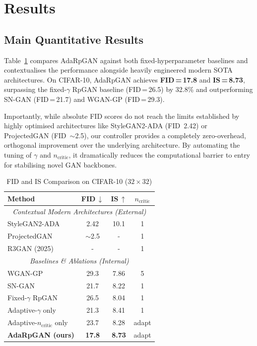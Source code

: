 \documentclass{article}
\newcommand{\ncritic}{n_{\mathrm{critic}}}
\begin{document}
\section{Results}
\label{sec:results}

\subsection{Main Quantitative Results}

Table~\ref{tab:main_results} compares AdaRpGAN against both fixed-hyperparameter baselines and contextualises the performance alongside heavily engineered modern SOTA architectures. 
On CIFAR-10, AdaRpGAN achieves \textbf{FID\,=\,17.8} and \textbf{IS\,=\,8.73}, surpassing the fixed-$\gamma$ RpGAN baseline (FID\,=\,26.5) by 32.8\% and outperforming SN-GAN (FID\,=\,21.7) and WGAN-GP (FID\,=\,29.3). 

Importantly, while absolute FID scores do not reach the limits established by highly optimised architectures like StyleGAN2-ADA (FID~2.42) or ProjectedGAN (FID~$\sim$2.5), our controller provides a completely zero-overhead, orthogonal improvement over the underlying architecture. By automating the tuning of $\gamma$ and $\ncritic$, it dramatically reduces the computational barrier to entry for stabilising novel GAN backbones.

\begin{table}[t]
\caption{FID and IS Comparison on CIFAR-10 ($32{\times}32$)}
\label{tab:main_results}
\centering
\begin{tabular}{l c c c}
\toprule
\textbf{Method} & \textbf{FID\,$\downarrow$} & \textbf{IS\,$\uparrow$} & $\ncritic$ \\
\midrule
\multicolumn{4}{c}{\textit{Contextual Modern Architectures (External)}} \\
StyleGAN2-ADA~\cite{karras2020training}       & 2.42 & 10.1 & 1      \\
ProjectedGAN~\cite{sauer2021projected}        & $\sim$2.5 & - & 1      \\
R3GAN (2025)~\cite{kancharla2025r3gan}        & - & - & 1      \\
\midrule
\multicolumn{4}{c}{\textit{Baselines \& Ablations (Internal)}} \\
WGAN-GP~\cite{gulrajani2017improved}          & 29.3 & 7.86 & 5      \\
SN-GAN~\cite{miyato2018spectral}              & 21.7 & 8.22 & 1      \\
Fixed-$\gamma$ RpGAN                          & 26.5 & 8.04 & 1      \\
Adaptive-$\gamma$ only                        & 21.3 & 8.41 & 1      \\
Adaptive-$\ncritic$ only                      & 23.7 & 8.28 & adapt  \\
\textbf{AdaRpGAN (ours)}                      & \textbf{17.8} & \textbf{8.73} & adapt \\
\bottomrule
\end{tabular}
\end{table}
\end{document}
